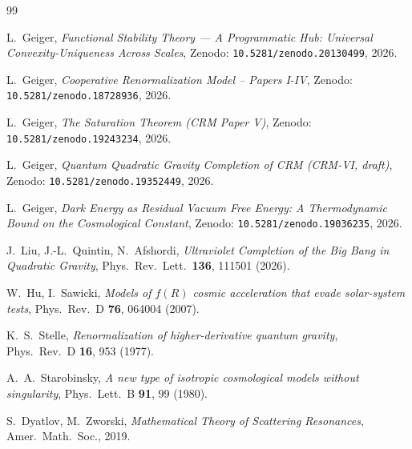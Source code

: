 \documentclass[11pt,a4paper]{article}
\theoremstyle{remark}
\begin{document}
\begin{thebibliography}{99}

L.~Geiger,
\emph{Functional Stability Theory --- A Programmatic Hub:
Universal Convexity-Uniqueness Across Scales},
Zenodo: \texttt{10.5281/zenodo.20130499}, 2026.

L.~Geiger,
\emph{Cooperative Renormalization Model -- Papers I-IV},
Zenodo: \texttt{10.5281/zenodo.18728936}, 2026.

L.~Geiger,
\emph{The Saturation Theorem (CRM Paper V)},
Zenodo: \texttt{10.5281/zenodo.19243234}, 2026.

L.~Geiger,
\emph{Quantum Quadratic Gravity Completion of CRM (CRM-VI, draft)},
Zenodo: \texttt{10.5281/zenodo.19352449}, 2026.

L.~Geiger,
\emph{Dark Energy as Residual Vacuum Free Energy: A Thermodynamic
Bound on the Cosmological Constant},
Zenodo: \texttt{10.5281/zenodo.19036235}, 2026.

J.~Liu, J.-L.~Quintin, N.~Afshordi,
\emph{Ultraviolet Completion of the Big Bang in Quadratic Gravity},
Phys.\ Rev.\ Lett.\ \textbf{136}, 111501 (2026).

W.~Hu, I.~Sawicki,
\emph{Models of $f(R)$ cosmic acceleration that evade solar-system
tests}, Phys.\ Rev.\ D \textbf{76}, 064004 (2007).

K.~S.~Stelle,
\emph{Renormalization of higher-derivative quantum gravity},
Phys.\ Rev.\ D \textbf{16}, 953 (1977).

A.~A.~Starobinsky,
\emph{A new type of isotropic cosmological models without
singularity}, Phys.\ Lett.\ B \textbf{91}, 99 (1980).

S.~Dyatlov, M.~Zworski,
\emph{Mathematical Theory of Scattering Resonances},
Amer.\ Math.\ Soc., 2019.

\end{thebibliography}
\end{document}
